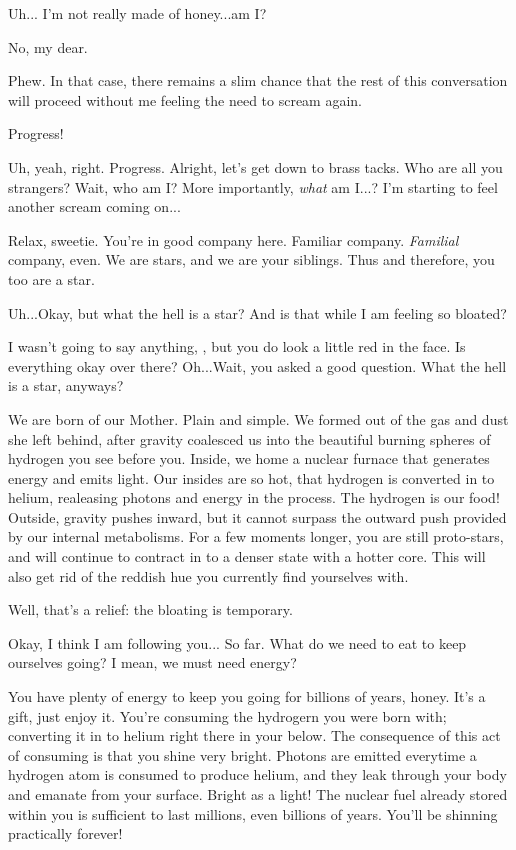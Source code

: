 \documentclass[main.tex]{subfiles}
\begin{document}
\newpara \Sterope  Uh... I'm not really made of honey...am I?  

\newpara \Maia No, my dear.

\newpara \Sterope  Phew.  In that case, there remains a slim chance that the rest of this conversation will proceed without me feeling the need to scream again.

\newpara \Maia Progress!

\newpara \Sterope Uh, yeah, right.  Progress.  Alright, let's get down to brass tacks.  Who are all you strangers?  Wait, who am I?  More importantly, \textit{what} am I...?  I'm starting to feel another scream coming on...

\newpara \Maia Relax, sweetie.  You're in good company here.  Familiar company.  \textit{Familial} company, even. We are stars, and we are your siblings.  Thus and therefore, you too are a star.  

\newpara \Sterope Uh...Okay, but what the hell is a star?  And is that while I am feeling so bloated?

\newpara \Alcyone I wasn't going to say anything, \rmsterope, but you do look a little red in the face.  Is everything okay over there?  Oh...Wait, you asked a good question.  What the hell is a star, anyways?

\newpara \Maia We are born of our Mother.  Plain and simple.  We formed out of the gas and dust she left behind, after gravity coalesced us into the beautiful burning spheres of hydrogen you see before you.  Inside, we home a nuclear furnace that generates energy and emits light.  Our insides are so hot, that hydrogen is converted in to helium, realeasing photons and energy in the process.  The hydrogen is our food!  Outside, gravity pushes inward, but it cannot surpass the outward push provided by our internal metabolisms.  For a few moments longer, you are still proto-stars, and will continue to contract in to a denser state with a hotter core.  This will also get rid of the reddish hue you currently find yourselves with.

\newpara \Sterope Well, that's a relief: the bloating is temporary.

\newpara \Alcyone Okay, I think I am following you... So far.  What do we need to eat to keep ourselves going?  I mean, we must need energy?

\newpara \Maia You have plenty of energy to keep you going for billions of years, honey.  It's a gift, just enjoy it.  You're consuming the hydrogern you were born with; converting it in to helium right there in your below.  The consequence of this act of consuming is that you shine very bright.  Photons are emitted everytime a hydrogen atom is consumed to produce helium, and they leak through your body and emanate from your surface.  Bright as a light!  The nuclear fuel already stored within you is sufficient to last millions, even billions of years.  You'll be shinning practically forever!
\end{document}

